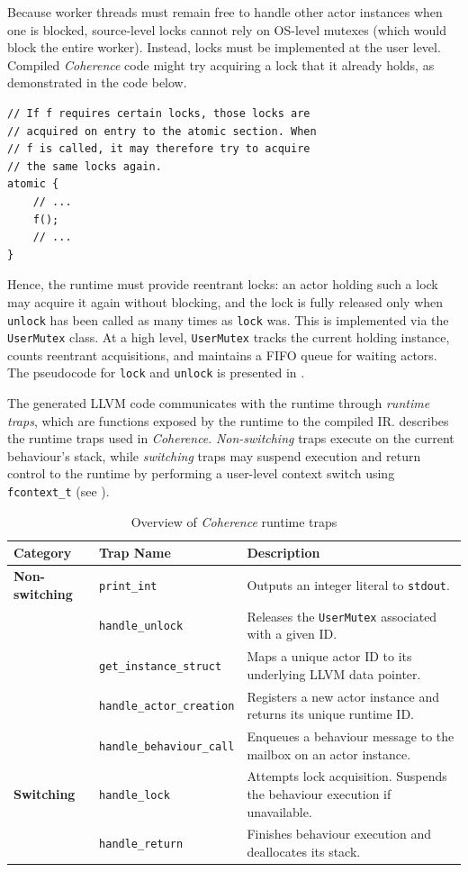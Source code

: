 Because worker threads must remain free to handle other actor instances when one is blocked, source-level locks cannot rely on OS-level mutexes (which would block the entire worker). Instead, locks must be implemented at the user level. Compiled \textit{Coherence} code might try acquiring a lock that it already holds, as demonstrated in the code below.
\begin{verbatim}
// If f requires certain locks, those locks are
// acquired on entry to the atomic section. When
// f is called, it may therefore try to acquire
// the same locks again.
atomic {
    // ...
    f();
    // ...
}
\end{verbatim}
Hence, the runtime must provide reentrant locks: an actor holding such a lock may acquire it again without blocking, and the lock is fully released only when \texttt{unlock} has been called as many times as \texttt{lock} was. This is implemented via the \texttt{UserMutex} class. At a high level, \texttt{UserMutex} tracks the current holding instance, counts reentrant acquisitions, and maintains a FIFO queue for waiting actors. The pseudocode for \texttt{lock} and \texttt{unlock} is presented in .

The generated LLVM code communicates with the runtime through \textit{runtime traps}, which are functions exposed by the runtime to the compiled IR.  describes the runtime traps used in \textit{Coherence}. \textit{Non-switching} traps execute on the current behaviour's stack, while \textit{switching} traps may suspend execution and return control to the runtime by performing a user-level context switch using \texttt{fcontext\_t} (see ).

\begin{table}[H]
\centering
\small
\label{tab:runtime-traps}
\begin{tabular}{l l p{8cm}}
\toprule
\textbf{Category} & \textbf{Trap Name} & \textbf{Description} \\ \midrule
\textbf{Non-switching} & \texttt{print\_int} & Outputs an integer literal to \texttt{stdout}. \\ \addlinespace
& \texttt{handle\_unlock} & Releases the \texttt{UserMutex} associated with a given ID. \\ \addlinespace
& \texttt{get\_instance\_struct} & Maps a unique actor ID to its underlying LLVM data pointer. \\ \addlinespace
& \texttt{handle\_actor\_creation} & Registers a new actor instance and returns its unique runtime ID. \\ \addlinespace
& \texttt{handle\_behaviour\_call} & Enqueues a behaviour message to the mailbox on an actor instance. \\ \midrule
\textbf{Switching} & \texttt{handle\_lock} & Attempts lock acquisition. Suspends the behaviour execution if unavailable. \\ \addlinespace
& \texttt{handle\_return} & Finishes behaviour execution and deallocates its stack. \\ \bottomrule
\end{tabular}
\caption{Overview of \textit{Coherence} runtime traps}
\end{table}

